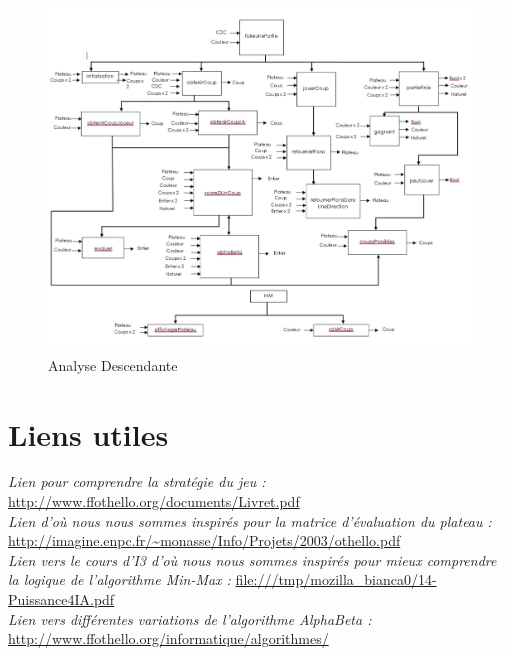 \documentclass{article}
\begin{document}
\begin{figure}[h]
\caption{Analyse Descendante}
\centering
\includegraphics[width=1.1\textwidth]{analyseDescendante.jpg}
\end{figure}

\newpage


\newpage

\newpage

\newpage

\newpage

\newpage
\section{Liens utiles}
\textit{Lien pour comprendre la stratégie du jeu : }
\url{http://www.ffothello.org/documents/Livret.pdf}\\

\textit{Lien d'où nous nous sommes inspirés pour la matrice d'évaluation du plateau :}
\url{http://imagine.enpc.fr/~monasse/Info/Projets/2003/othello.pdf}\\

\textit{Lien vers le cours d'I3 d'où nous nous sommes inspirés pour mieux comprendre la logique de l'algorithme Min-Max :}
\url{file:///tmp/mozilla_bianca0/14-Puissance4IA.pdf}\\

\textit{Lien vers différentes variations de l'algorithme AlphaBeta :}
\url{http://www.ffothello.org/informatique/algorithmes/}\\
\end{document}

